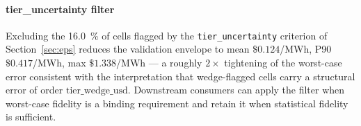 \paragraph{tier\_uncertainty filter}
Excluding the \SI{16.0}{\percent} of cells flagged by the
\texttt{tier\_uncertainty} criterion of Section~\ref{sec:eps}
reduces the validation envelope to mean $\$0.124$/MWh, P90
$\$0.417$/MWh, max $\$1.338$/MWh — a roughly $2\times$ tightening
of the worst-case error consistent with the interpretation that
wedge-flagged cells carry a structural error of order
$\mathrm{tier\_wedge\_usd}$.  Downstream consumers can apply the
filter when worst-case fidelity is a binding requirement and retain
it when statistical fidelity is sufficient.
